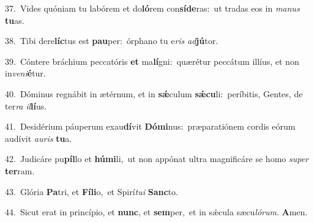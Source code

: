 {\numbfont\textcolor{\numbcolor}{37.}}~Vides quóniam tu labórem et do\-\textbf{ló}\-rem con\-\textbf{sí}\-\textbf{de}ras:~\star ut tradas eos in \textit{ma}\-\textit{nus} \textbf{tu}\-as.\par
{\numbfont\textcolor{\numbcolor}{38.}}~Tibi dere\-\textbf{líc}\-tus est \textbf{pau}\-per:~\star órphano tu e\textit{ris} \textit{ad}\-\textbf{jú}tor.\par
{\numbfont\textcolor{\numbcolor}{39.}}~Cóntere bráchium peccatóris \textbf{et} ma\-\textbf{lí}\-gni:~\star quærétur peccátum illíus, et non in\-\textit{ve}\-\textit{ni}\textbf{é}tur.\par
{\numbfont\textcolor{\numbcolor}{40.}}~Dóminus regnábit in ætérnum, et in \textbf{sǽ}\-culum \textbf{sǽ}\-\textbf{cu}li:~\star períbitis, Gentes, de ter\textit{ra} \textit{il}\-\textbf{lí}us.\par
{\numbfont\textcolor{\numbcolor}{41.}}~Desidérium páuperum exau\-\textbf{dí}\-vit \textbf{Dó}\-\textbf{mi}nus:~\star præparatiónem cordis eórum audívit \textit{au}\-\textit{ris} \textbf{tu}\-a.\par
{\numbfont\textcolor{\numbcolor}{42.}}~Judicáre pu\-\textbf{píl}\-lo et \textbf{hú}\-\textbf{mi}li,~\star ut non appónat ultra magnificáre se homo \textit{su}\-\textit{per} \textbf{ter}\-ram.\par
{\numbfont\textcolor{\numbcolor}{43.}}~Glória \textbf{Pa}\-tri, et \textbf{Fí}\-\textbf{li}o,~\star et Spirí\-\textit{tu}\-\textit{i} \textbf{Sanc}\-to.\par
{\numbfont\textcolor{\numbcolor}{44.}}~Sicut erat in princípio, et \textbf{nunc}\-, et \textbf{sem}\-per,~\star et in sǽcula sæcu\-\textit{ló}\-\textit{rum}. \textbf{A}\-men.\par

